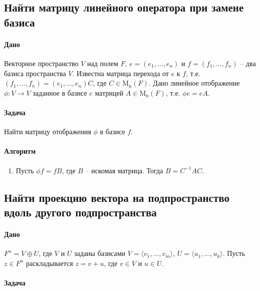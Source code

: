 \documentclass{article}
\newcommand{\Matrix}[2]{\operatorname{\mathrm{M}_{#2}}(#1)}
\begin{document}
\subsection{Найти матрицу линейного оператора при замене базиса}

\paragraph{Дано}

Векторное пространство $V$ над полем $F$, $e=(e_1,\ldots,e_n)$ и $f = (f_1,\ldots,f_n)$ -- два базиса пространства $V$.
Известна матрица перехода от $e$ к $f$, т.е.
$(f_1,\ldots,f_n) = (e_1,\ldots,e_n)C$, где $C\in \Matrix{F}{n}$.
Дано линейное отображение $\phi\colon V\to V$ заданное в базисе $e$ матрицей $A\in\Matrix{F}{n}$, т.е. $\phi e = e A$.

\paragraph{Задача}

Найти матрицу отображения $\phi$ в базисе $f$.

\paragraph{Алгоритм}

\begin{enumerate}
\item Пусть $\phi f = f B$, где $B$ -- искомая матрица.
Тогда $B = C^{-1} A C$.
\end{enumerate}

\subsection{Найти проекцию вектора на подпространство вдоль другого подпространства}

\paragraph{Дано}

$F^{n} = V \oplus U$, где $V$ и $U$ заданы базисами $V = \langle v_1,\ldots,v_m\rangle$, $U = \langle u_1,\ldots,u_k\rangle$.
Пусть $z\in F^{n}$ раскладывается $z = v + u$, где $v\in V$ и $u\in U$.

\paragraph{Задача}
\end{document}
